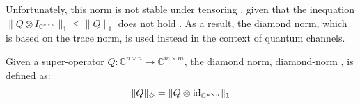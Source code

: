 


Unfortunately, this norm is not stable under tensoring , given that the inequation $ \lVert Q \otimes I_{\mathbb{C}^{n\times n}} \rVert_{1} \leq \lVert Q \rVert_{1}$ does not hold \cite{watrous2018theory}. As a result, the diamond norm, which is based on the trace norm, is used instead in the context of quantum channels. 

\begin{definition}
  Given a super-operator $Q: \mathbb{C}^{n\times n} \xrightarrow{} \mathbb{C}^{m\times m }$, the diamond norm, \gls{diamond-norm} , is defined as:
  \begin{equation*}  \label{eq:diamond_distance}
    \lVert Q \rVert_{\diamondsuit} =  \lVert Q \otimes \mathrm{id}_{\mathbb{C}^{n \times n}} \rVert_{1}
  \end{equation*}
\end{definition}

